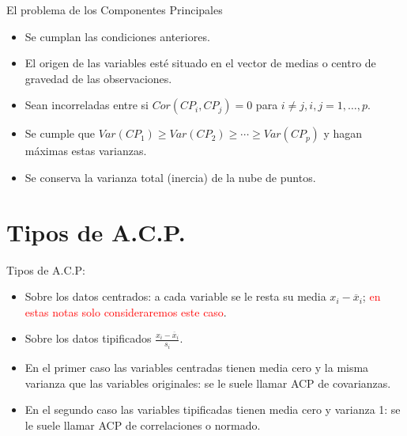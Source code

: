 \documentclass[
  ignorenonframetext,
]{beamer}
\providecommand{\tightlist}{%
  \setlength{\itemsep}{0pt}\setlength{\parskip}{0pt}}
\newcommand\red[1]{\textcolor{red}{#1}}
\begin{document}
\begin{frame}{El problema de los Componentes Principales}
\protect\hypertarget{el-problema-de-los-componentes-principales-2}{}
\begin{itemize}
\tightlist
\item
  Se cumplan las condiciones anteriores.
\item
  El origen de las variables esté situado en el vector de medias o
  centro de gravedad de las observaciones.
\item
  Sean incorreladas entre si \(Cor(CP_i,CP_j)=0\) para
  \(i\not= j, i,j =1,\ldots,p\).
\item
  Se cumple que \(Var(CP_1)\geq Var(CP_2)\geq\cdots\geq Var(CP_p)\) y
  hagan máximas estas varianzas.
\item
  Se conserva la varianza total (inercia) de la nube de puntos.
\end{itemize}
\end{frame}

\hypertarget{tipos-de-a.c.p.}{%
\section{Tipos de A.C.P.}\label{tipos-de-a.c.p.}}

\begin{frame}{Tipos de A.C.P:}
\protect\hypertarget{tipos-de-a.c.p}{}
\begin{itemize}
\tightlist
\item
  Sobre los datos centrados: a cada variable se le resta su media
  \(x_i-\overline{x}_i\);
  \red{en estas notas solo consideraremos este caso}.
\item
  Sobre los datos tipificados \(\frac{x_{i}-\overline{x}_i}{s_i}\).
\item
  En el primer caso las variables centradas tienen media cero y la misma
  varianza que las variables originales: se le suele llamar ACP de
  covarianzas.
\item
  En el segundo caso las variables tipificadas tienen media cero y
  varianza 1: se le suele llamar ACP de correlaciones o normado.
\end{itemize}
\end{frame}
\end{document}
